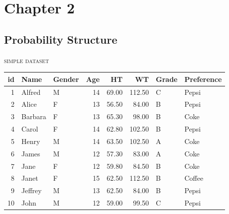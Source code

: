 \documentclass[dvipdfmx, serif,handout]{beamer}
\begin{document}
\begin{frame}
	\titlepage
\end{frame}
\section{Chapter 2}
\subsection{Probability Structure}
\begin{frame}{\textsc{simple dataset}}
	\footnotesize
	\begin{table}[ht]
		\centering
		\begin{tabular}{rllrrrll}
			\hline
			id & Name    & Gender & Age & HT    & WT     & Grade & Preference \\
			\hline
			1  & Alfred  & M      & 14  & 69.00 & 112.50 & C     & Pepsi      \\
			2  & Alice   & F      & 13  & 56.50 & 84.00  & B     & Pepsi      \\
			3  & Barbara & F      & 13  & 65.30 & 98.00  & B     & Coke       \\
			4  & Carol   & F      & 14  & 62.80 & 102.50 & B     & Pepsi      \\
			5  & Henry   & M      & 14  & 63.50 & 102.50 & A     & Coke       \\
			6  & James   & M      & 12  & 57.30 & 83.00  & A     & Coke       \\
			7  & Jane    & F      & 12  & 59.80 & 84.50  & B     & Coke       \\
			8  & Janet   & F      & 15  & 62.50 & 112.50 & B     & Coffee     \\
			9  & Jeffrey & M      & 13  & 62.50 & 84.00  & B     & Pepsi      \\
			10 & John    & M      & 12  & 59.00 & 99.50  & C     & Pepsi      \\
			\hline
		\end{tabular}
	\end{table}


\end{frame}
\end{document}
